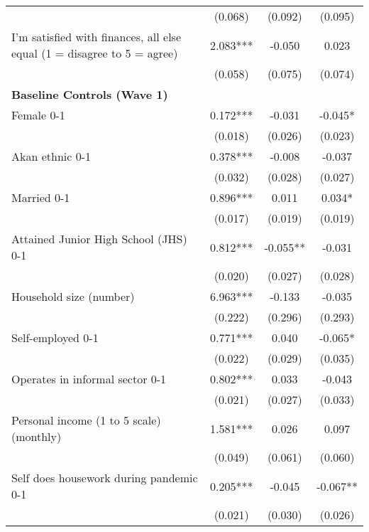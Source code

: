 \begin{ThreePartTable}
\begin{table}[tbp]
\begin{tabular}{lccc}
                   &      (0.068)     &      (0.092)     &      (0.095)     \\ [0.1em] 
 I'm satisfied with finances, all else equal (1 = disagree to 5 = agree) & 2.083*** & -0.050 & 0.023 \\ [0.1em] 
                   &      (0.058)     &      (0.075)     &      (0.074)     \\ [0.1em] 
\textbf{Baseline Controls (Wave 1)} & & & \\ 
 Female 0-1 & 0.172*** & -0.031 & -0.045* \\ [0.1em] 
                   &      (0.018)     &      (0.026)     &      (0.023)     \\ [0.1em] 
 Akan ethnic 0-1 & 0.378*** & -0.008 & -0.037 \\ [0.1em] 
                   &      (0.032)     &      (0.028)     &      (0.027)     \\ [0.1em] 
 Married 0-1 & 0.896*** & 0.011 & 0.034* \\ [0.1em] 
                   &      (0.017)     &      (0.019)     &      (0.019)     \\ [0.1em] 
 Attained Junior High School (JHS) 0-1 & 0.812*** & -0.055** & -0.031 \\ [0.1em] 
                   &      (0.020)     &      (0.027)     &      (0.028)     \\ [0.1em] 
 Household size (number) & 6.963*** & -0.133 & -0.035 \\ [0.1em] 
                   &      (0.222)     &      (0.296)     &      (0.293)     \\ [0.1em] 
 Self-employed 0-1 & 0.771*** & 0.040 & -0.065* \\ [0.1em] 
                   &      (0.022)     &      (0.029)     &      (0.035)     \\ [0.1em] 
 Operates in informal sector 0-1 & 0.802*** & 0.033 & -0.043 \\ [0.1em] 
                   &      (0.021)     &      (0.027)     &      (0.033)     \\ [0.1em] 
 Personal income (1 to 5 scale) (monthly) & 1.581*** & 0.026 & 0.097 \\ [0.1em] 
                   &      (0.049)     &      (0.061)     &      (0.060)     \\ [0.1em] 
 Self does housework during pandemic 0-1 & 0.205*** & -0.045 & -0.067** \\ [0.1em] 
                   &      (0.021)     &      (0.030)     &      (0.026)     \\ [0.1em] 

\end{tabular}
\end{table}
\end{ThreePartTable}
